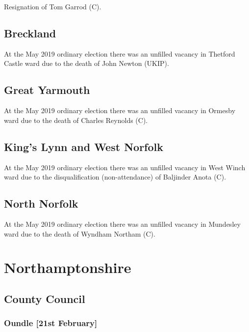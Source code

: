 \documentclass[a4paper,openany]{book}
\begin{document}
\begin{resultsiii}

Resignation of Tom Garrod (C).

\subsection*{Breckland}

At the May 2019 ordinary election there was an unfilled vacancy in Thetford Castle ward due to the death of John Newton (UKIP).

\subsection*{Great Yarmouth}

At the May 2019 ordinary election there was an unfilled vacancy in Ormesby ward due to the death of Charles Reynolds (C).

\subsection*{King's Lynn and West Norfolk}

At the May 2019 ordinary election there was an unfilled vacancy in West Winch ward due to the disqualification (non-attendance) of Baljinder Anota (C).

\subsection*{North Norfolk}

At the May 2019 ordinary election there was an unfilled vacancy in Mundesley ward due to the death of Wyndham Northam (C).

\section{Northamptonshire}

\subsection*{County Council}

\subsubsection*{Oundle \hspace*{\fill}\nolinebreak[1]%
	\enspace\hspace*{\fill}
	[21st February]}


\end{resultsiii}
\end{document}
